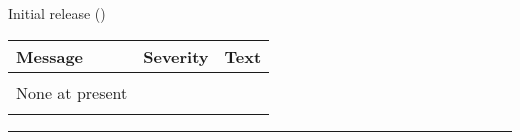 \begin{release}
  \begin{relist}
    \item Initial release ()
  \end{relist}
\end{release}

\begin{messages}
{
\begin{tabular}{p{0.25\hsize} p{0.1\hsize} p{0.35\hsize}} \hline  
  \textbf{Message} & \textbf{Severity} & \textbf{Text} \\ \hline
                   &                   &   \\ %
   None at present &                   &   \\ 
                   &                   &   \\ \hline %
\end{tabular}
} 
\end{messages}

\rule{\hsize}{2mm}

\newpage
